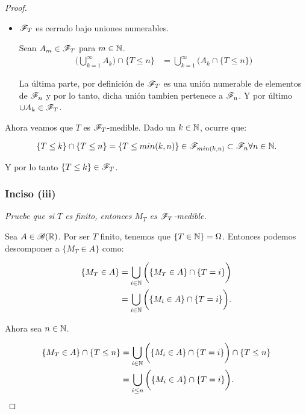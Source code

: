 \begin{proof}
\begin{itemize}
			\item ${\mathscr{F}_T}$ es cerrado bajo uniones numerables.
			
				Sean ${A_m \in \mathscr{F}_T}$ para ${m \in \mathbb{N}}$.
				\begin{align}
					\bigg( \bigcup_{k=1}^\infty A_k \bigg) \cap \{ T \leq n \} 	&=	\bigcup_{k=1}^\infty \bigg( A_k \cap \{ T \leq n \} \bigg)
				\end{align}								
				
				La última parte, por definición de ${\mathscr{F}_T}$ es una unión numerable de elementos de ${\mathscr{F}_n}$ y por lo tanto, dicha unión
				tambien pertenece a ${\mathscr{F}_n}$. Y por último ${\cup A_k \in \mathscr{F}_T}$.
		\end{itemize}
		
		Ahora veamos que $T$ es $\mathscr{F}_T$-medible. Dado un $k \in \mathbb{N}$, ocurre que:
		
		\begin{align}
			\{T \leq k\} \cap \{T \leq n\} = \{T \leq min(k,n)\} \in \mathscr{F}_{min(k, n)} \subset \mathscr{F}_n \forall n \in \mathbb{N}.
		\end{align}

		Y por lo tanto $\{T \leq k\} \in \mathscr{F}_T$.
		
	\subsubsection{Inciso (iii)}
	\emph{
		Pruebe que si ${T}$ es finito, entonces ${M_T}$ es ${\mathscr{F}_T}$-medible.\\
	}
	
		Sea $A \in \mathscr{B}(\mathbb{R})$. Por ser $T$ finito, tenemos que $\{ T \in \mathbb{N} \} = \Omega$. Entonces
		podemos descomponer a $\{ M_T \in A \}$ como:
		
		\begin{align}
			\{ M_T \in A \}		&=		\bigcup_{i \in \mathbb{N}} \bigg( \{ M_T \in A \} \cap \{ T = i \} \bigg)\\
								&=		\bigcup_{i \in \mathbb{N}} \bigg( \{ M_i \in A \} \cap \{ T = i \} \bigg).
		\end{align}
	
		Ahora sea $n \in \mathbb{N}$. 
		
		\begin{align}
			\{ M_T \in A \} \cap \{ T \leq n \}		&=		\bigcup_{i \in \mathbb{N}} \bigg( \{ M_i \in A \} \cap \{ T = i \} \bigg) \cap \{ T \leq n \} \\
													&=		\bigcup_{i \leq n} \bigg( \{ M_i \in A \} \cap \{ T = i \} \bigg).
		\end{align}
		

\end{proof}
